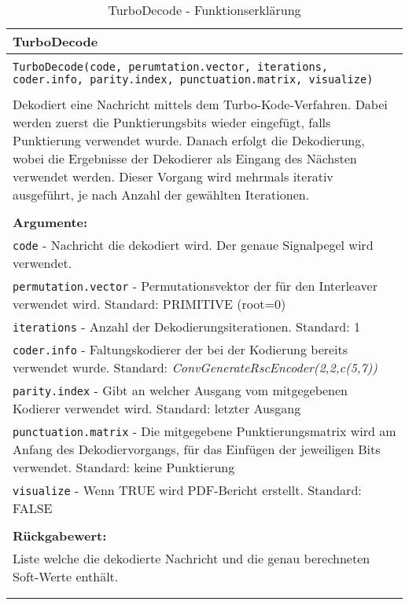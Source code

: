 \begin{longtable}{|p{\textwidth}|}
\hline
\rowcolor{lightblue}TurboDecode\\
\hline
\\
\texttt{TurboDecode(code, perumtation.vector, iterations, coder.info, parity.index, punctuation.matrix, visualize)}\\
\\
Dekodiert eine Nachricht mittels dem Turbo-Kode-Verfahren. Dabei werden zuerst die Punktierungsbits wieder eingefügt, falls Punktierung verwendet wurde. Danach erfolgt die Dekodierung, wobei die Ergebnisse der Dekodierer als Eingang des Nächsten verwendet werden. Dieser Vorgang wird mehrmals iterativ ausgeführt, je nach Anzahl der gewählten Iterationen.\\
\\
\textbf{Argumente:}\\
\texttt{code} - Nachricht die dekodiert wird. Der genaue Signalpegel wird verwendet.\\
\texttt{permutation.vector} - Permutationsvektor der für den Interleaver verwendet wird. Standard: PRIMITIVE (root=0)\\
\texttt{iterations} - Anzahl der Dekodierungsiterationen. Standard: 1\\
\texttt{coder.info} - Faltungskodierer der bei der Kodierung bereits verwendet wurde. Standard: \emph{ConvGenerateRscEncoder(2,2,c(5,7))}\\
\texttt{parity.index} - Gibt an welcher Ausgang vom mitgegebenen Kodierer verwendet wird. Standard: letzter Ausgang\\
\texttt{punctuation.matrix} - Die mitgegebene Punktierungsmatrix wird am Anfang des Dekodiervorgangs,  für das Einfügen der jeweiligen Bits verwendet. Standard: keine Punktierung\\
\texttt{visualize} - Wenn TRUE wird PDF-Bericht erstellt. Standard: FALSE\\
\\
\textbf{Rückgabewert:}\\
Liste welche die dekodierte Nachricht und die genau berechneten Soft-Werte enthält.\\
\\
\hline
\caption{TurboDecode - Funktionserklärung}
\end{longtable}